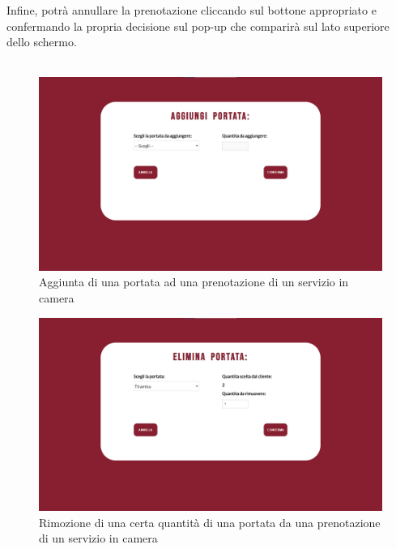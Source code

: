\documentclass [a4paper, 12pt]{book}
\begin{document}
Infine, potrà annullare la prenotazione cliccando sul bottone appropriato e confermando la propria decisione sul pop-up che comparirà sul lato superiore dello schermo.\\\\
\begin{figure}[h]
\centering
\includegraphics[scale=0.3]{AggiungiPortataPrenotazioneSC.png}
\caption{Aggiunta di una portata ad una prenotazione di un servizio in camera}
\label{AggiungiPortataPrenotazioneSC}
\end{figure}\newpage

\begin{figure}[h]
\centering
\includegraphics[scale=0.3]{EliminaPortata.png}
\caption{Rimozione di una certa quantità di una portata da una prenotazione di un servizio in camera}
\label{EliminaPortata}
\end{figure}
\end{document}
